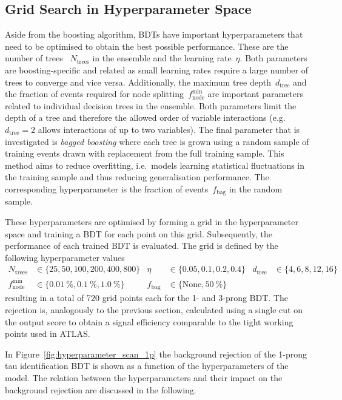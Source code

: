 \subsection{Grid Search in Hyperparameter Space}
\label{sec:bdt_grid_search}

Aside from the boosting algorithm, BDTs have important hyperparameters that need
to be optimised to obtain the best possible performance. These are the number of
trees~ $N_\text{trees}$ in the ensemble and the learning rate~$\eta$. Both
parameters are boosting-specific and related as small learning rates require a
large number of trees to converge and vice versa. Additionally, the maximum tree
depth~$d_\text{tree}$ and the fraction of events required for node
splitting~$f_\text{node}^\text{min}$ are important parameters related to
individual decision trees in the ensemble. Both parameters limit the depth of a
tree and therefore the allowed order of variable interactions (e.g.\
$d_\text{tree} = 2$ allows interactions of up to two variables). The final
parameter that is investigated is \emph{bagged boosting} where each tree is
grown using a random sample of training events drawn with replacement from the
full training sample. This method aims to reduce overfitting, i.e.\ models
learning statistical fluctuations in the training sample and thus reducing
generalisation performance. The corresponding hyperparameter is the fraction of
events~$f_\text{bag}$ in the random sample.

These hyperparameters are optimised by forming a grid in the hyperparameter
space and training a BDT for each point on this grid. Subsequently, the
performance of each trained BDT is evaluated. The grid is defined by the
following hyperparameter values
\begin{align*}
  N_\mathrm{trees} &\in \{25, 50, 100, 200, 400, 800\} & \eta &\in \{0.05, 0.1, 0.2, 0.4\} & d_\mathrm{tree} &\in \{4, 6, 8, 12, 16\}\\
  f_\mathrm{node}^\mathrm{min} &\in \{\SI{0.01}{\percent}, \SI{0.1}{\percent},\SI{1.0}{\percent}\} & f_\text{bag} &\in \{\text{None}, \SI{50}{\percent} \}
\end{align*}
resulting in a total of 720 grid points each for the 1- and 3-prong BDT. The
rejection is, analogously to the previous section, calculated using a single cut
on the output score to obtain a signal efficiency comparable to the tight
working points used in ATLAS.

In Figure~\ref{fig:hyperparameter_scan_1p} the background rejection of the
1-prong tau identification BDT is shown as a function of the hyperparameters of
the model. The relation between the hyperparameters and their impact on the
background rejection are discussed in the following.

